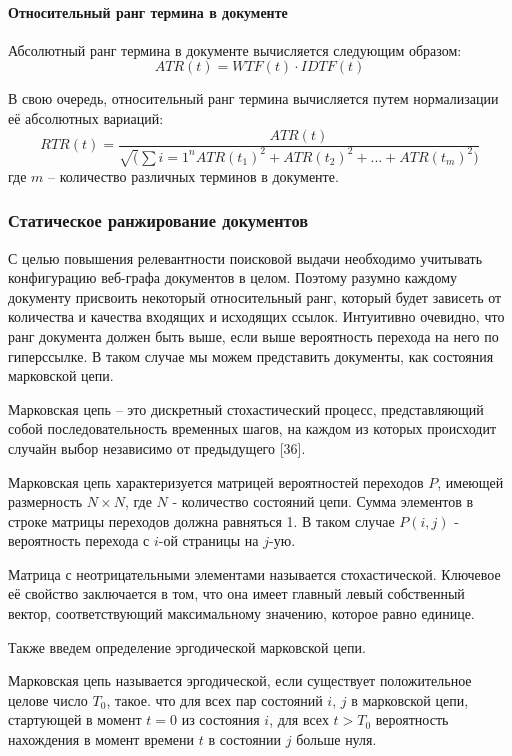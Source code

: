 \paragraph{Относительный ранг термина в документе}

Абсолютный ранг термина в документе вычисляется следующим образом:
\begin{equation}
ATR(t) = WTF(t) \cdot IDTF(t)
\end{equation}

В свою очередь, относительный ранг термина вычисляется путем нормализации её абсолютных вариаций:
\begin{equation}
RTR(t) = \frac{ATR(t)}{\sqrt(\sum{i = 1}^{n}ATR(t_1)^2 + ATR(t_2)^2 + ... + ATR(t_m)^2)}
\end{equation} где $m$ -- количество различных терминов в документе.

\subsubsection{Статическое ранжирование документов}

С целью повышения релевантности поисковой выдачи необходимо учитывать конфигурацию веб-графа документов в целом. Поэтому разумно каждому документу присвоить некоторый относительный ранг, который будет зависеть от количества и качества входящих и исходящих ссылок. Интуитивно очевидно, что ранг документа должен быть выше, если выше вероятность перехода на него по гиперссылке. В таком случае мы можем представить документы, как состояния марковской цепи. 

Марковская цепь -- это дискретный стохастический процесс, представляющий собой последовательность временных шагов, на каждом из которых происходит случайн выбор независимо от предыдущего [36].

Марковская цепь характеризуется матрицей вероятностей переходов $P$, имеющей размерность $N \times N$, где $N$ - количество состояний цепи. Сумма элементов в строке матрицы переходов должна равняться 1. В таком случае $P(i, j)$ - вероятность перехода с $i$-ой страницы на $j$-ую.

Матрица с неотрицательными элементами называется стохастической. Ключевое её свойство заключается в том, что она имеет главный левый собственный вектор, соответствующий максимальному значению, которое равно единице.

Также введем определение эргодической марковской цепи.

Марковская цепь называется эргодической, если существует положительное целове число $T_0$, такое. что для всех пар состояний $i$, $j$ в марковской цепи, стартующей в момент $t = 0$ из состояния $i$, для всех $t > T_0$ вероятность нахождения в момент времени $t$ в состоянии $j$ больше нуля.


